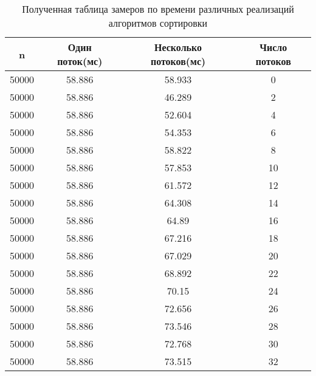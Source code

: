 \begin{table}[ht]
	\centering
	\caption{Полученная таблица замеров по времени различных реализаций алгоритмов сортировки}
	\begin{tabular}{|c|c|c|c|}
		\hline
	n       &  Один поток(мс) & Несколько потоков(мс) & Число потоков \\ \hline
	50000 & 58.886                  & 58.933                            & 0           \\ \hline
	50000 & 58.886                  & 46.289                            & 2           \\ \hline
	50000 & 58.886                  & 52.604                            & 4           \\ \hline
	50000 & 58.886                  & 54.353                            & 6           \\ \hline
	50000 & 58.886                  & 58.822                            & 8           \\ \hline
	50000 & 58.886                  & 57.853                            & 10          \\ \hline
	50000 & 58.886                  & 61.572                            & 12          \\ \hline
	50000 & 58.886                  & 64.308                            & 14          \\ \hline
	50000 & 58.886                  & 64.89                             & 16          \\ \hline
	50000 & 58.886                  & 67.216                            & 18          \\ \hline
	50000 & 58.886                  & 67.029                            & 20          \\ \hline
	50000 & 58.886                  & 68.892                            & 22          \\ \hline
	50000 & 58.886                  & 70.15                             & 24          \\ \hline
	50000 & 58.886                  & 72.656                            & 26          \\ \hline
	50000 & 58.886                  & 73.546                            & 28          \\ \hline
	50000 & 58.886                  & 72.768                            & 30          \\ \hline
	50000 & 58.886                  & 73.515                            & 32          \\ \hline

\end{tabular}
\end{table}
